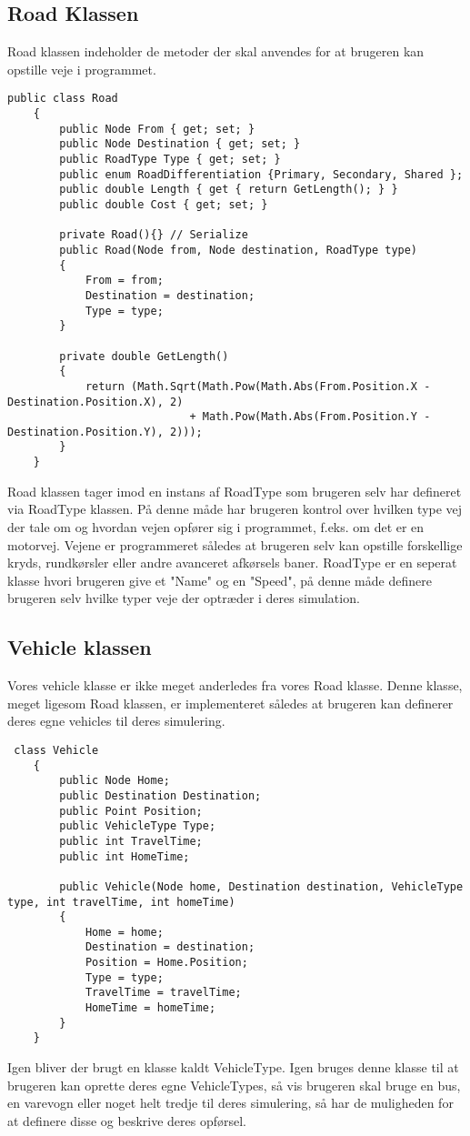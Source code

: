 \subsection{Road Klassen}
Road klassen indeholder de metoder der skal anvendes for at brugeren kan opstille veje i programmet.
\begin{lstlisting}
public class Road
    {
        public Node From { get; set; }
        public Node Destination { get; set; }
        public RoadType Type { get; set; }
        public enum RoadDifferentiation {Primary, Secondary, Shared };
        public double Length { get { return GetLength(); } }
        public double Cost { get; set; }

        private Road(){} // Serialize
        public Road(Node from, Node destination, RoadType type)
        {
            From = from;
            Destination = destination;
            Type = type;
        }

        private double GetLength()
        {
            return (Math.Sqrt(Math.Pow(Math.Abs(From.Position.X - Destination.Position.X), 2) 
                            + Math.Pow(Math.Abs(From.Position.Y - Destination.Position.Y), 2)));
        }
    }
\end{lstlisting}
Road klassen tager imod en instans af RoadType som brugeren selv har defineret via RoadType klassen. På denne måde har brugeren kontrol over hvilken type vej der tale om og hvordan vejen opfører sig i programmet, f.eks. om det er en motorvej. Vejene er programmeret således at brugeren selv kan opstille forskellige kryds, rundkørsler eller andre avanceret afkørsels baner. RoadType er en seperat klasse hvori brugeren give et "Name" og en "Speed", på denne måde definere brugeren selv hvilke typer veje der optræder i deres simulation.

\subsection{Vehicle klassen}
Vores vehicle klasse er ikke meget anderledes fra vores Road klasse. Denne klasse, meget ligesom Road klassen, er implementeret således at brugeren kan definerer deres egne vehicles til deres simulering.
\begin{lstlisting}
 class Vehicle
    {
        public Node Home;
        public Destination Destination;
        public Point Position;
        public VehicleType Type;
        public int TravelTime;
        public int HomeTime;

        public Vehicle(Node home, Destination destination, VehicleType type, int travelTime, int homeTime)
        {
            Home = home;
            Destination = destination;
            Position = Home.Position;
            Type = type;
            TravelTime = travelTime;
            HomeTime = homeTime;
        }
    }
\end{lstlisting}
Igen bliver der brugt en klasse kaldt VehicleType. Igen bruges denne klasse til at brugeren kan oprette deres egne VehicleTypes, så vis brugeren skal bruge en bus, en varevogn eller noget helt tredje til deres simulering, så har de muligheden for at definere disse og beskrive deres opførsel.


